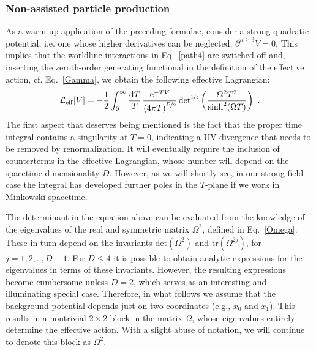 \documentclass[12pt,a4paper]{article}
\numberwithin{equation}{section}
\numberwithin{equation}{section}
\begin{document}
\subsubsection{Non-assisted particle production}\label{sec:non-assisted}
As a warm up application of the preceding formulae, consider a strong quadratic potential, i.e. one whose higher derivatives can be neglected, $\partial^{n\geq 3}V= 0$.
This implies that the worldline interactions in Eq.~\eqref{path4} are switched off and, inserting the zeroth-order generating functional in the definition of the effective action, cf. Eq.~\eqref{Gamma}, we obtain the following effective Lagrangian:
\begin{equation} \label{3.45}
 \mathcal{L}_{\mathrm{eff}}[V]=-\frac12 \int_0^{\infty} \frac{{\rm d}T}{T} \, \frac{\mathrm{e}^{-TV}}{\left( 4\pi T \right)^{\nicefrac{D}{2}}} \, \mathrm{det}^{\nicefrac{1}{2}}\left( \frac{\Omega^2T^2}{\sinh^2(\Omega T)} \right)\ .
\end{equation}
The first aspect that deserves being mentioned is the fact that the proper time integral contains a singularity at $T=0$, indicating a UV divergence that needs to be removed by renormalization. It will eventually require the inclusion of counterterms in the effective Lagrangian, whose number will depend on the spacetime dimensionality $D$. However, as we will shortly see, in our strong field case the integral has developed further poles in the $T$-plane if we work in Minkowski spacetime. 

The determinant in the equation above can be evaluated from the knowledge of the eigenvalues of the real and symmetric matrix $\Omega^2$, defined in Eq.~\eqref{Omega}. These in turn depend on the invariants $\mathrm{det}(\Omega^2)$ and $\mathrm{tr}\left(\Omega^{2j}\right)$, for $j=1,2,.., D-1$. For $D\leq 4$ it is possible to obtain analytic expressions for the eigenvalues in terms of these invariants. However, the resulting expressions become cumbersome unless $D=2$, which serves as an interesting and illuminating special case. Therefore, in what follows we assume that the background potential depends just on two coordinates (e.g., $x_0$ and $x_1$). This results in a nontrivial $2\times 2$ block in the matrix $\Omega$, whose eigenvalues entirely determine the effective action. With a slight abuse of notation, we will continue to denote this block as $\Omega^2$.
\end{document}
